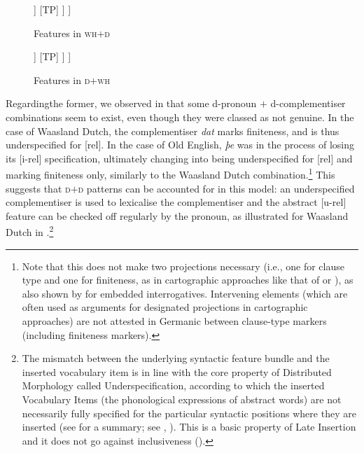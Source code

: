 \documentclass[output=paper]{langscibook}
\begin{document}
\begin{figure}
\begin{floatrow}
\captionsetup{margin=.05\linewidth}
\ffigbox
{\begin{forest}
[CP
	[which\textsubscript{{[}u-rel{]}}]
	[C$'$
		[C\textsubscript{{[}i-rel{]},{[}fin{]}} [that\textsubscript{{[}i-rel{]},{[}fin{]}}]]
		[TP]
	]
]
\end{forest}}
{\caption{Features in \textsc{wh}$+$\textsc{d}}\label{bacsk:fig:treewhd}}

\ffigbox
{\begin{forest}
[CP
	[der\textsubscript{{[}i-rel{]}}]
	[C$'$
		[C\textsubscript{{[}u-rel{]},{[}fin{]}} [wo\textsubscript{{[}u-rel{]},{[}fin{]}}]]
		[TP]
	]
]
\end{forest}}
{\caption{Features in \textsc{d}$+$\textsc{wh}} 
\label{bacsk:fig:treedwh}}
\end{floatrow}
\end{figure}

Regarding\largerpage[2] the former, we observed in  that some d-pronoun $+$ d-com\-ple\-men\-tiser combinations seem to exist, even though they were classed as not genuine. In the case of Waasland Dutch, the complementiser \textit{dat} marks finiteness, and is thus underspecified for [rel]. In the case of Old English, \textit{þe} was in the process of losing its [i-rel] specification, ultimately changing into being underspecified for [rel] and marking finiteness only, similarly to the Waasland Dutch combination.\footnote{Note that this does not make two projections necessary (i.e., one for clause type and one for finiteness, as in cartographic approaches like that of \citealt{rizzi1997} or \citealt{baltin2010}), as also shown by \citet{bacskaiatkari2020jcgl} for embedded interrogatives. Intervening elements (which are often used as arguments for designated projections in cartographic approaches) are not attested in Germanic between clause-type markers (including finiteness markers).} This suggests that \textsc{d}$+$\textsc{d} patterns can be accounted for in this model: an underspecified complementiser is used to lexicalise the complementiser and the abstract [u-rel] feature can be checked off regularly by the pronoun, as illustrated for Waasland Dutch in .{\footnote{The mismatch between the underlying syntactic feature bundle and the inserted vocabulary item is in line with the core property of Distributed Morphology called Underspecification, according to which the inserted Vocabulary Items (the phonological expressions of abstract words) are not necessarily fully specified for the particular syntactic positions where they are inserted (see \citealt[401--405]{mcginnisarchibald2016} for a summary; see \citealt{hallemarantz1994}, \citealt{harleynoyer1999}). This is a basic property of Late Insertion and it does not go against inclusiveness (\citealt[225]{chomsky1995}).}}\pagebreak
\end{document}
